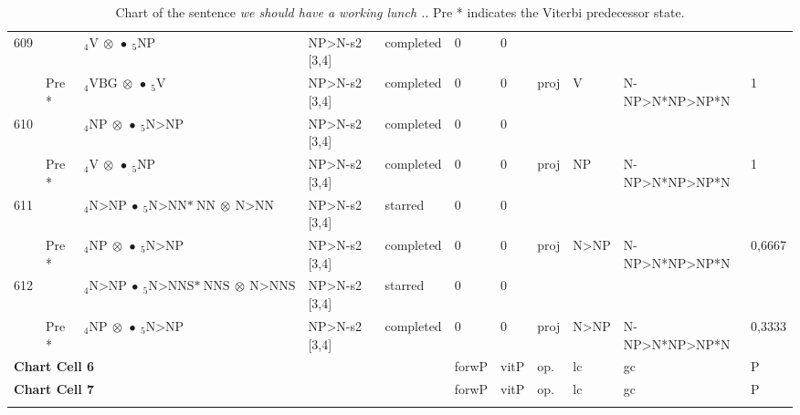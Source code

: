 \documentclass[10pt]{article}
\begin{document}
\begin{longtable}[htbp]{lllllllllll}
609 & & $ {}_4 \textrm{V} \  \otimes \  \bullet \ {}_{5} \textrm{NP} $ & NP>N-s2 [3,4] & completed & 0 & 0 & & & & \\ 
 & Pre *& $ {}_4 \textrm{VBG} \  \otimes \  \bullet \ {}_{5} \textrm{V} $ & NP>N-s2 [3,4] & completed & 0 & 0 & proj & V & N-NP>N*NP>NP*N & 1 \\ 
610 & & $ {}_4 \textrm{NP} \  \otimes \  \bullet \ {}_{5} \textrm{N>NP} $ & NP>N-s2 [3,4] & completed & 0 & 0 & & & & \\ 
 & Pre *& $ {}_4 \textrm{V} \  \otimes \  \bullet \ {}_{5} \textrm{NP} $ & NP>N-s2 [3,4] & completed & 0 & 0 & proj & NP & N-NP>N*NP>NP*N & 1 \\ 
611 & & $ {}_4 \textrm{N>NP} \  \bullet \ {}_{5} \textrm{N>NN*} \ \textrm{NN} \  \otimes \ \textrm{N>NN} $ & NP>N-s2 [3,4] & starred & 0 & 0 & & & & \\ 
 & Pre *& $ {}_4 \textrm{NP} \  \otimes \  \bullet \ {}_{5} \textrm{N>NP} $ & NP>N-s2 [3,4] & completed & 0 & 0 & proj & N>NP & N-NP>N*NP>NP*N & 0,6667 \\ 
612 & & $ {}_4 \textrm{N>NP} \  \bullet \ {}_{5} \textrm{N>NNS*} \ \textrm{NNS} \  \otimes \ \textrm{N>NNS} $ & NP>N-s2 [3,4] & starred & 0 & 0 & & & & \\ 
 & Pre *& $ {}_4 \textrm{NP} \  \otimes \  \bullet \ {}_{5} \textrm{N>NP} $ & NP>N-s2 [3,4] & completed & 0 & 0 & proj & N>NP & N-NP>N*NP>NP*N & 0,3333 \\ 
\hline \multicolumn{5}{l}{\textbf{Chart Cell 6}} & forwP & vitP & op. & lc & gc & P \\ \hline
\hline \multicolumn{5}{l}{\textbf{Chart Cell 7}} & forwP & vitP & op. & lc & gc & P \\ \hline
\hline
\caption{Chart of the sentence \emph{we should have a working lunch .}. Pre * indicates the Viterbi predecessor state.}
\label{tab:chart}
\end{longtable}
\end{document}
